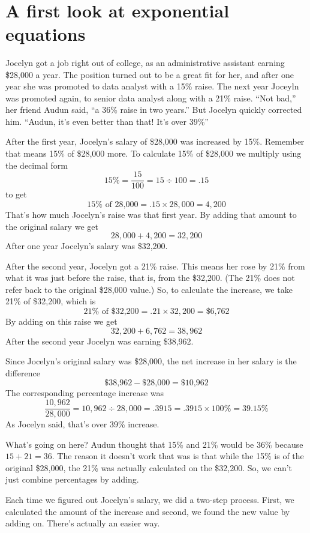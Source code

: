 ~\vspace{.1in}

\section{A first look at exponential equations}

Jocelyn got a job right out of college, as an administrative assistant earning \$28,000 a year.  The position turned out to be a great fit for her, and after one year she was promoted to data analyst with a 15\% raise.  The next year Joceyln was promoted again, to senior data analyst along with a 21\% raise.  ``Not bad,'' her friend Audun said, ``a 36\% raise in two years.''  But Jocelyn quickly corrected him.  ``Audun, it's even better than that!  It's over 39\%''

After the first year, Jocelyn's salary of \$28,000 was increased by 15\%.  Remember that means 15\% of \$28,000 more.  To calculate 15\% of \$28,000 we multiply using the decimal form 
$$15\% = \frac{15}{100} = 15 \div 100 = .15$$
to get 
$$15\% \text{ of  28,000} = .15 \times 28,000 = 4,200$$
  That's how much Jocelyn's raise was that first year.  By adding that amount to the original salary we get 
  $$28,000 + 4,200 = 32,200$$
After one year Jocelyn's salary was \${32,200}.

After the second year, Jocelyn got a 21\% raise.  This means her rose by 21\% from what it was just before the raise, that is, from the \$32,200.  (The 21\% does not refer back to the original \$28,000 value.)  So, to calculate the increase, we take 21\% of \$32,200, which is 
$$21\% \text{ of  \$32,200} = .21 \times 32,200 = \text{\$6,762}$$  
By adding on this raise we get 
$$32,200+ 6,762 = 38,962$$  
After the second year Jocelyn was earning \$38,962.

Since Jocelyn's original salary was \$28,000, the net increase in her salary is the difference 
$$\text{\$38,962} - \text{\$28,000} = \text{\$10,962}$$ The corresponding percentage increase was 
$$\frac{10,962}{28,000}= 10,962 \div 28,000 = .3915 = .3915 \times 100\% = 39.15\%$$  
As Jocelyn said, that's over 39\% increase.  

What's going on here? Audun thought that 15\% and 21\% would be 36\% because $15 + 21 = 36$.
The reason it doesn't work that was is that while the 15\% is of the original \$28,000, the 21\% was actually calculated on the \$32,200.  So, we can't just combine percentages by adding.

Each time we figured out Jocelyn's salary, we did a two-step process.  First, we calculated the amount of the increase and second, we found the new value by adding on.  There's actually an easier way.  

